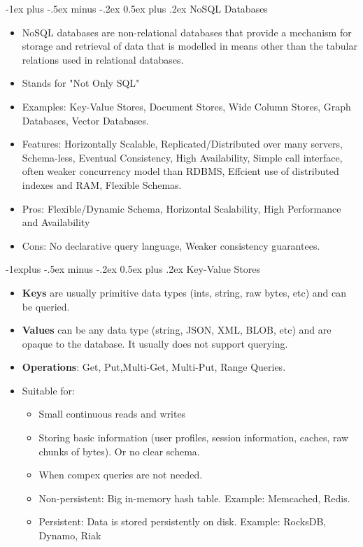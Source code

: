 \documentclass[10pt, landscape]{article}
\makeatletter
\renewcommand{\section}{\@startsection{section}{1}{0mm}%
  {-1ex plus -.5ex minus -.2ex}%
  {0.5ex plus .2ex}%
{\normalfont\large\bfseries}}
\renewcommand{\subsection}{\@startsection{subsection}{2}{0mm}%
  {-1explus -.5ex minus -.2ex}%
  {0.5ex plus .2ex}%
{\normalfont\normalsize\bfseries}}
\makeatother
\begin{document}
\begin{multicols*}{4}
  \section{NoSQL Databases}

  \begin{itemize}
    \item NoSQL databases are non-relational databases that provide a mechanism for storage and retrieval of data that is modelled in means other than the tabular relations used in relational databases.
    \item Stands for "Not Only SQL"
    \item Examples: Key-Value Stores, Document Stores, Wide Column Stores, Graph Databases, Vector Databases.
    \item Features: Horizontally Scalable, Replicated/Distributed over many servers, Schema-less, Eventual Consistency, High Availability, Simple call interface, often weaker concurrency model than RDBMS, Effcient use of distributed indexes and RAM, Flexible Schemas.
    \item Pros: Flexible/Dynamic Schema, Horizontal Scalability, High Performance and Availability
    \item Cons: No declarative query language, Weaker consistency guarantees.
  \end{itemize}

  \subsection{Key-Value Stores}
  \begin{itemize}
    \item \textbf{Keys} are usually primitive data types (ints, string, raw bytes, etc) and can be queried.
    \item \textbf{Values} can be any data type (string, JSON, XML, BLOB, etc) and are opaque to the database. It usually does not support querying.
    \item \textbf{Operations}: Get, Put,Multi-Get, Multi-Put, Range Queries.
    \item Suitable for:
    \begin{itemize}
      \item Small continuous reads and writes
      \item Storing basic information (user profiles, session information, caches, raw chunks of bytes). Or no clear schema.
      \item When compex queries are not needed.
      \item Non-persistent: Big in-memory hash table. Example: Memcached, Redis.
      \item Persistent: Data is stored persistently on disk. Example: RocksDB, Dynamo, Riak
    \end{itemize}
  \end{itemize}


\end{multicols*}
\end{document}
